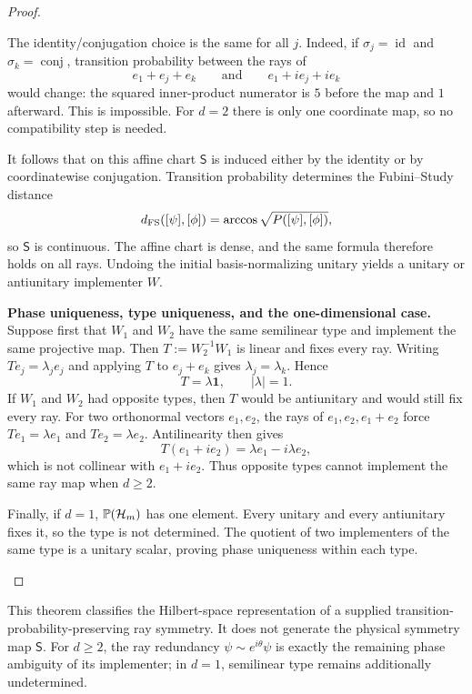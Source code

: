 \documentclass[12pt,a4paper]{article}
\begin{document}
\begin{proof}
\begin{proofsteps}
The identity/conjugation choice is the same for all \(j\).  Indeed, if
\(\sigma_j=\operatorname{id}\) and
\(\sigma_k=\operatorname{conj}\), transition probability between the rays of
\[
e_1+e_j+e_k
\qquad\text{and}\qquad
e_1+ie_j+ie_k
\]
would change: the squared inner-product numerator is \(5\) before the map and
\(1\) afterward.  This is impossible.  For \(d=2\) there is only one
coordinate map, so no compatibility step is needed.

It follows that on this affine chart \(\mathsf S\) is induced either by the
identity or by coordinatewise conjugation.  Transition probability determines
the Fubini--Study distance
\[
d_{\rm FS}([\psi],[\phi])
=\arccos\sqrt{P([\psi],[\phi])},
\]
so \(\mathsf S\) is continuous.  The affine chart is dense, and the same
formula therefore holds on all rays.  Undoing the initial basis-normalizing
unitary yields a unitary or antiunitary implementer \(W\).


\item \textbf{Phase uniqueness, type uniqueness, and the one-dimensional case.}
Suppose first that \(W_1\) and \(W_2\) have the same semilinear type and
implement the same projective map.  Then
\(T:=W_2^{-1}W_1\) is linear and fixes every ray.  Writing
\(Te_j=\lambda_je_j\) and applying \(T\) to \(e_j+e_k\) gives
\(\lambda_j=\lambda_k\).  Hence
\[
T=\lambda\mathbf1,
\qquad
|\lambda|=1.
\]
If \(W_1\) and \(W_2\) had opposite types, then \(T\) would be antiunitary and
would still fix every ray.  For two orthonormal vectors \(e_1,e_2\), the rays
of \(e_1,e_2,e_1+e_2\) force
\(Te_1=\lambda e_1\) and \(Te_2=\lambda e_2\).  Antilinearity then gives
\[
T(e_1+ie_2)=\lambda e_1-i\lambda e_2,
\]
which is not collinear with \(e_1+ie_2\).  Thus opposite types cannot
implement the same ray map when \(d\ge2\).

Finally, if \(d=1\), \(\mathbb{P}(\mathcal H_m)\) has one element.  Every unitary and
every antiunitary fixes it, so the type is not determined.  The quotient of
two implementers of the same type is a unitary scalar, proving phase
uniqueness within each type.
\end{proofsteps}

\end{proof}

This theorem classifies the Hilbert-space representation of a supplied
transition-probability-preserving ray symmetry.  It does not generate the
physical symmetry map \(\mathsf S\).  For \(d\ge2\), the ray redundancy
\(\psi\sim e^{i\theta}\psi\) is exactly the remaining phase ambiguity of its
implementer; in \(d=1\), semilinear type remains additionally undetermined.
\end{document}
